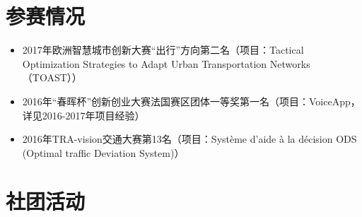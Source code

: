 \documentclass[letterpaper]{twentysecondcv} %
\begin{document}
\section{参赛情况}
\vspace{-0.1cm}
\begin{itemize}
    \item 2017年欧洲智慧城市创新大赛``出行''方向第二名（项目：Tactical Optimization Strategies to Adapt Urban Transportation Networks（TOAST））
    \item 2016年``春晖杯''创新创业大赛法国赛区团体一等奖第一名（项目：VoiceApp，详见2016-2017年项目经验）
    \item 2016年TRA-vision交通大赛第13名（项目：Système d'aide à la décision ODS (Optimal traffic Deviation System)）
\end{itemize}

\section{社团活动}
\end{document}
